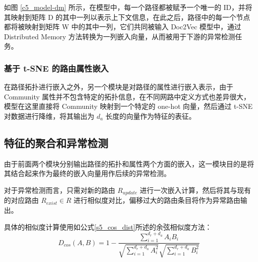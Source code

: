 
如图 \ref{c5_model-dm} 所示，在模型中，每一个路径都被赋予一个唯一的 ID，并将其映射到矩阵 D 的其中一列以表示上下文信息，在此之后，路径中的每一个节点都将被映射到矩阵 W 中的其中一列，它们共同被输入 Doc2Vec 模型中，通过 Distributed Memory 方法转换为一列嵌入向量，从而被用于下游的异常检测任务。

\subsubsection{基于 t-SNE 的路由属性嵌入}

在路径拓扑进行嵌入之外，另一个模块是对路径的属性进行嵌入表示，由于 Community 属性并不包含特定的拓扑信息，在不同网路中定义方式也差异很大，模型在这里直接将 Community 映射到一个特定的 one-hot 向量，然后通过 t-SNE 对数据进行降维，将其输出为 $d_a$ 长度的向量作为特征的表征。

\subsection{特征的聚合和异常检测}

由于前面两个模块分别输出路径的拓扑和属性两个方面的嵌入，这一模块目的是将其结合起来作为最终的嵌入向量用作后续的异常检测。

对于异常检测而言，只需对新的路由 $R_{update}$ 进行一次嵌入计算，然后将其与现有的对应路由 $R_{exist} \in R$ 进行相似度对比，偏移过大的路由条目将作为异常路由输出。

具体的相似度计算使用如公式\ref{s5_cos_dist}所述的余弦相似度方法：
\begin{equation} \label{s5_cos_dist}
D_{cos}(A,B) = 1 - \frac{\sum_{i=1}^{d_r+d_a} A_i B_i}{\sqrt{\sum_{i=1}^{d_r+d_a} A_i^2}\sqrt{\sum_{i=1}^{d_r+d_a} B_i^2}}
\end{equation}